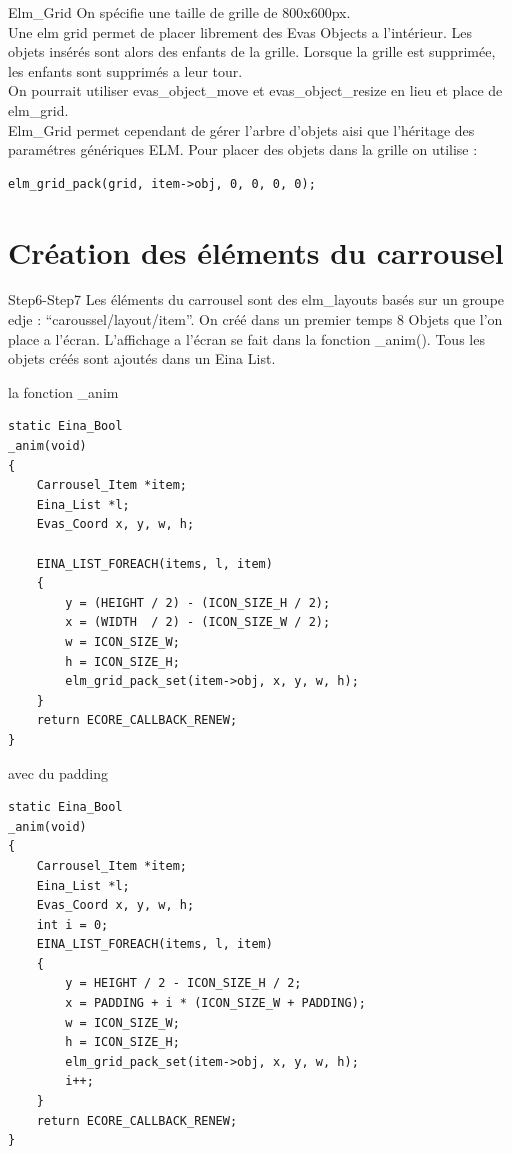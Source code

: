 \documentclass{beamer}
\begin{document}
\begin{frame}[fragile]{Elm\_Grid}
On spécifie une taille de grille de 800x600px. \\
Une elm grid permet de placer librement des Evas Objects a l'intérieur. Les objets insérés sont alors des enfants de la grille. Lorsque la grille est supprimée, les enfants sont supprimés a leur tour.\\
On pourrait utiliser evas\_object\_move et evas\_object\_resize en lieu et place de elm\_grid.\\
Elm\_Grid permet cependant de gérer l'arbre d'objets aisi que l'héritage des paramétres génériques ELM.
Pour placer des objets dans la grille on utilise :
\begin{lstlisting}
elm_grid_pack(grid, item->obj, 0, 0, 0, 0);
\end{lstlisting}
\end{frame}

\section{Création des éléments du carrousel}

\begin{frame}[fragile]{Step6-Step7}
Les éléments du carrousel sont des elm\_layouts basés sur un groupe edje : ``caroussel/layout/item''.
On créé dans un premier temps 8 Objets que l'on place a l'écran. L'affichage a l'écran se fait dans la fonction \_anim(). Tous les objets créés sont ajoutés dans un Eina List.
\end{frame}

\begin{frame}[fragile]{la fonction \_anim}
\begin{lstlisting}
static Eina_Bool
_anim(void)
{
    Carrousel_Item *item;
    Eina_List *l;
    Evas_Coord x, y, w, h;

    EINA_LIST_FOREACH(items, l, item)
    {
        y = (HEIGHT / 2) - (ICON_SIZE_H / 2);
        x = (WIDTH  / 2) - (ICON_SIZE_W / 2);
        w = ICON_SIZE_W;
        h = ICON_SIZE_H;
        elm_grid_pack_set(item->obj, x, y, w, h);
    }
    return ECORE_CALLBACK_RENEW;
}
\end{lstlisting}
\end{frame}

\begin{frame}[fragile]{avec du padding}
\begin{lstlisting}
static Eina_Bool
_anim(void)
{
    Carrousel_Item *item;
    Eina_List *l;
    Evas_Coord x, y, w, h;
    int i = 0;
    EINA_LIST_FOREACH(items, l, item)
    {
        y = HEIGHT / 2 - ICON_SIZE_H / 2;
        x = PADDING + i * (ICON_SIZE_W + PADDING);
        w = ICON_SIZE_W;
        h = ICON_SIZE_H;
        elm_grid_pack_set(item->obj, x, y, w, h);
        i++;
    }
    return ECORE_CALLBACK_RENEW;
}
\end{lstlisting}
\end{frame}
\end{document}
